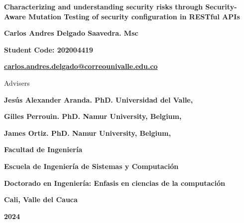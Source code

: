 
\begin{titlepage}
\begin{comment}

		\begin{center}
			{\bf Characterizing and understanding security risks through Security-Aware Mutation Testing of security configuration in RESTful-APIs}
			\vfill
			{\bf Carlos Andres Delgado Saavedra. Msc \par}
			{\bf Código: 2004419 \par}
			{\bf carlos.andres.delgado@correounivalle.edu.co }
			\vfill
			{\bf Facultad de Ingeniería \par}
			{\bf Escuela de Ingeniería de Sistemas y Computación \par}
			{\bf Doctorado en Ingeniería: Enfasis en ciencias de la computación\par}
			{\bf Cali, Valle del Cauca \par}
			{\bf 2024 \par}
    \end{center}
\newpage
\end{comment}
	\begin{center}
			{\bf Characterizing and understanding security risks through Security-Aware Mutation Testing of security configuration in RESTful APIs}
			\vfill
			{\bf Carlos Andres Delgado Saavedra. Msc \par}
			{\bf Student Code: 202004419 \par}
			{\bf \href{mailto:carlos.andres.delgado@correounivalle.edu.co}{carlos.andres.delgado@correounivalle.edu.co }}
			\vfill

		{Advisers \par}
		{\bf Jesús Alexander Aranda. PhD. Universidad del Valle, \par}
		{\bf Gilles Perrouin. PhD. Namur University, Belgium, \par}
    {\bf James Ortiz. PhD. Namur University, Belgium, \par}
			\vfill 
			{\bf Facultad de Ingeniería \par}
			{\bf Escuela de Ingeniería de Sistemas y Computación \par}
			{\bf Doctorado en Ingeniería: Enfasis en ciencias de la computación\par}
			{\bf Cali, Valle del Cauca \par}
			{\bf 2024 \par}
    \end{center}
\end{titlepage} 
